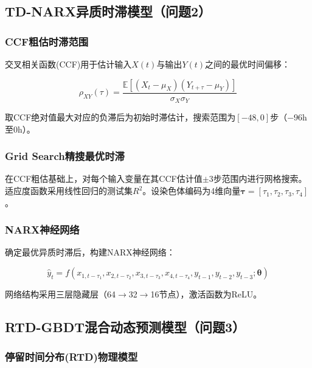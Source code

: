 \documentclass[12pt,a4paper]{ctexart}
\begin{document}
\subsection{TD-NARX异质时滞模型（问题2）}

\subsubsection{CCF粗估时滞范围}

交叉相关函数(CCF)用于估计输入$X(t)$与输出$Y(t)$之间的最优时间偏移：

\begin{equation}\label{eq:ccf}
\rho_{XY}(\tau) = \frac{\mathbb{E}[(X_t - \mu_X)(Y_{t+\tau} - \mu_Y)]}{\sigma_X \sigma_Y}
\end{equation}

取CCF绝对值最大对应的负滞后为初始时滞估计，搜索范围为$[-48, 0]$步（$-96$h至0h）。

\subsubsection{Grid Search精搜最优时滞}

在CCF粗估基础上，对每个输入变量在其CCF估计值$\pm3$步范围内进行网格搜索。
适应度函数采用线性回归的测试集$R^2$。设染色体编码为4维向量$\boldsymbol{\tau} = [\tau_1, \tau_2, \tau_3, \tau_4]$。

\subsubsection{NARX神经网络}

确定最优异质时滞后，构建NARX神经网络：

\begin{equation}\label{eq:narx}
\hat{y}_t = f(x_{1,t-\tau_1}, x_{2,t-\tau_2}, x_{3,t-\tau_3}, x_{4,t-\tau_4}, y_{t-1}, y_{t-2}, y_{t-3}; \boldsymbol{\theta})
\end{equation}

网络结构采用三层隐藏层（64$\to$32$\to$16节点），激活函数为ReLU\cite{ref3}。

\subsection{RTD-GBDT混合动态预测模型（问题3）}

\subsubsection{停留时间分布(RTD)物理模型}
\end{document}
